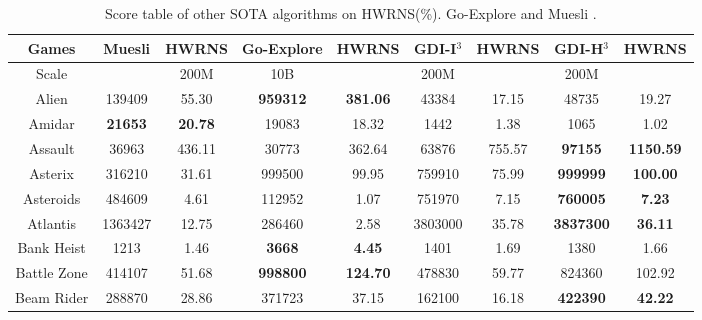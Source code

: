 \documentclass[nohyperref]{article}
\theoremstyle{plain}
\begin{document}
\begin{table}[!hb] 
\footnotesize
\begin{center}
\caption{Score table of other SOTA  algorithms on HWRNS(\%). Go-Explore \citep{goexplore} and Muesli \citep{muesli}.}
\label{Tab: Score table of other SOTA  algorithms on HWRNS.}
\setlength{\tabcolsep}{1.0pt}
\begin{tabular}{| c | c c |c c |c c |c c |}
\hline
 Games      & Muesli              & HWRNS        & Go-Explore              & HWRNS                   & GDI-I$^3$ & HWRNS & GDI-H$^3$ & HWRNS\\
\hline
Scale       &                     & 200M        & 10B                     &                             & 200M      &    &    200M   &\\
\hline    
 Alien        &139409          &55.30               &\textbf{959312}       &\textbf{381.06}                & 43384             &17.15     &48735             &19.27            \\
 Amidar       &\textbf{21653}  &\textbf{20.78}      &19083        &18.32                & 1442              &1.38                         &1065              &1.02          \\
 Assault      &36963           &436.11           &30773                 &362.64                         & 63876      &755.57&\textbf{97155}    &\textbf{1150.59}           \\
 Asterix      &316210          &31.61            &999500       &99.95                 & 759910            &75.99        &\textbf{999999}            &\textbf{100.00}    \\
 Asteroids    &484609          &4.61             &112952                &1.07                           & 751970     &7.15  &\textbf{760005}            &\textbf{7.23}        \\
 Atlantis     &1363427         &12.75            &286460                &2.58                           & 3803000    &35.78 &\textbf{3837300}           &\textbf{36.11}         \\
 Bank Heist   &1213            &1.46          &\textbf{3668}         &\textbf{4.45  }                & 1401              &1.69            &1380              &1.66    \\
 Battle Zone  &414107          &51.68            &\textbf{998800}       &\textbf{124.70}                & 478830            &59.77        &824360            &102.92     \\
 Beam Rider   &288870          &28.86         &371723       &37.15                & 162100            &16.18           &\textbf{422390}            &\textbf{42.22}     \\

\end{tabular}
\end{center}
\end{table}
\end{document}
